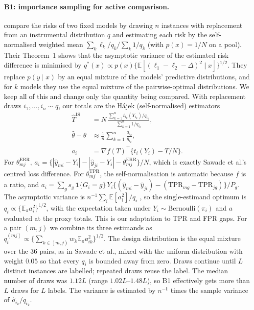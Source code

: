 \paragraph{B1: importance sampling for active comparison.} \citet{sawade2012active} compare the risks of two fixed models by drawing $n$ instances with replacement from an instrumental distribution $q$ and estimating each risk by the self-normalised weighted mean $\sum_k \ell_k/q_k\big/\sum_k 1/q_k$ (with $p(x)=1/N$ on a pool). Their Theorem~1 shows that the asymptotic variance of the estimated risk difference is minimised by $q^*(x)\propto p(x)\{\mathbb E[(\ell_1-\ell_2-\Delta)^2\mid x]\}^{1/2}$. They replace $p(y\mid x)$ by an equal mixture of the models' predictive distributions, and for $k$ models they use the equal mixture of the pairwise-optimal distributions. We keep all of this and change only the quantity being compared. With replacement draws $i_1,\dots,i_n\sim q$, our totals are the Hájek (self-normalised) estimators
\begin{align*}
\hat T^{\mathrm{IS}}&=N\,\frac{\sum_{k=1}^n t_{i_k}(Y_{i_k})/q_{i_k}}{\sum_{k=1}^n 1/q_{i_k}},\\
\hat\theta-\theta&\approx\frac1n\sum_{k=1}^n \frac{a_{i_k}}{q_{i_k}},\\
a_i&=\nabla f(T)^{\top}\{t_i(Y_i)-T/N\}.
\end{align*}
For $\theta^{\mathrm{ERR}}_{mj}$, $a_i=\{|\hat y_{mi}-Y_i|-|\hat y_{ji}-Y_i|-\theta^{\mathrm{ERR}}_{mj}\}/N$, which is exactly Sawade et al.'s centred loss difference. For $\theta^{\mathrm{TPR}}_{mj}$, the self-normalisation is automatic because $f$ is a ratio, and $a_i=\sum_g s_g\,\mathbf 1\{G_i=g\}\,Y_i\{(\hat y_{mi}-\hat y_{ji})-(\mathrm{TPR}_{mg}-\mathrm{TPR}_{jg})\}/P_g$. The asymptotic variance is $n^{-1}\sum_i\mathbb E[a_i^2]/q_i$ \citep{hansen1943}, so the single-estimand optimum is $q_i\propto\{\mathbb E_\pi a_i^2\}^{1/2}$, with the expectation taken under $Y_i\sim\mathrm{Bernoulli}(\pi_i)$ and $a$ evaluated at the proxy totals. This is our adaptation to TPR and FPR gaps. For a pair $(m,j)$ we combine its three estimands as $q^{(mj)}_i\propto\{\sum_{k\in(m,j)}w_k\mathbb E_\pi a_{ik}^2\}^{1/2}$. The design distribution is the equal mixture over the 36 pairs, as in Sawade et al., mixed with the uniform distribution with weight $0.05$ so that every $q_i$ is bounded away from zero. Draws continue until $L$ distinct instances are labelled; repeated draws reuse the label. The median number of draws was $1.12L$ (range $1.02L$--$1.48L$), so B1 effectively gets more than $L$ draws for $L$ labels. The variance is estimated by $n^{-1}$ times the sample variance of $\hat a_{i_k}/q_{i_k}$.

